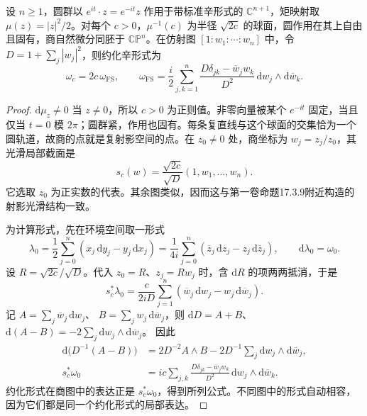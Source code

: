 \begin{theorem}\label{g4:thm:1003:projective-reduction}
	设 \(n\ge1\)，圆群以 \(e^{it}\cdot z=e^{-it}z\) 作用于带标准辛形式的 \(\mathbb C^{n+1}\)，矩映射取 \(\mu(z)=|z|^2/2\)。对每个 \(c>0\)，\(\mu^{-1}(c)\) 为半径 \(\sqrt{2c}\) 的球面，圆作用在其上自由且固有，商自然微分同胚于 \(\mathbb{CP}^n\)。在仿射图
	\([1:w_1:\cdots:w_n]\) 中，令 \(D=1+\sum_j|w_j|^2\)，则约化辛形式为
	\begin{equation}\label{g4:eq:1003:projective-form}
		\omega_c=2c\,\omega_{\mathrm{FS}},
		\qquad
		\omega_{\mathrm{FS}}
		=\frac{i}{2}\sum_{j,k=1}^n
		\frac{D\delta_{jk}-\overline w_jw_k}{D^2}
		\,\mathrm{d}w_j\wedge\mathrm{d}\overline w_k.
	\end{equation}
\end{theorem}
\begin{proof}
	\(\mathrm{d}\mu_z\ne0\) 当 \(z\ne0\)，所以 \(c>0\) 为正则值。非零向量被某个 \(e^{-it}\) 固定，当且仅当 \(t=0\) 模 \(2\pi\)；圆群紧，作用也固有。每条复直线与这个球面的交集恰为一个圆轨道，故商的点就是复射影空间的点。在 \(z_0\ne0\) 处，商坐标为 \(w_j=z_j/z_0\)，其光滑局部截面是
	\[
		s_c(w)=\frac{\sqrt{2c}}{\sqrt D}(1,w_1,\ldots,w_n).
	\]
	它选取 \(z_0\) 为正实数的代表。其余图类似，因而这与第一卷命题17.3.9附近构造的射影光滑结构一致。

	为计算形式，先在环境空间取一形式
	\[
		\lambda_0=\frac12\sum_{j=0}^n
		(x_j\,\mathrm{d}y_j-y_j\,\mathrm{d}x_j)
		=\frac1{4i}\sum_{j=0}^n
		(\overline z_j\,\mathrm{d}z_j-z_j\,\mathrm{d}\overline z_j),
		\qquad \mathrm{d}\lambda_0=\omega_0.
	\]
	设 \(R=\sqrt{2c}/\sqrt D\)。代入 \(z_0=R\)、\(z_j=Rw_j\) 时，含 \(\mathrm{d}R\) 的项两两抵消，于是
	\[
		s_c^*\lambda_0
		=\frac{c}{2iD}\sum_{j=1}^n
		(\overline w_j\,\mathrm{d}w_j-w_j\,\mathrm{d}\overline w_j).
	\]
	记 \(A=\sum_j\overline w_j\,\mathrm{d}w_j\)、
	\(B=\sum_jw_j\,\mathrm{d}\overline w_j\)，则
	\(\mathrm{d}D=A+B\)、
	\(\mathrm{d}(A-B)=-2\sum_j\mathrm{d}w_j\wedge\mathrm{d}\overline w_j\)。
	因此
	\[
		\begin{aligned}
			\mathrm{d}\bigl(D^{-1}(A-B)\bigr)
			&=2D^{-2}A\wedge B
				-2D^{-1}\sum_j\mathrm{d}w_j\wedge\mathrm{d}\overline w_j,\\
			s_c^*\omega_0
			&=ic\sum_{j,k}
			\frac{D\delta_{jk}-\overline w_jw_k}{D^2}
			\,\mathrm{d}w_j\wedge\mathrm{d}\overline w_k.
		\end{aligned}
	\]
	约化形式在商图中的表达正是 \(s_c^*\omega_0\)，得到所列公式。不同图中的形式自动相容，因为它们都是同一个约化形式的局部表达。
\end{proof}

